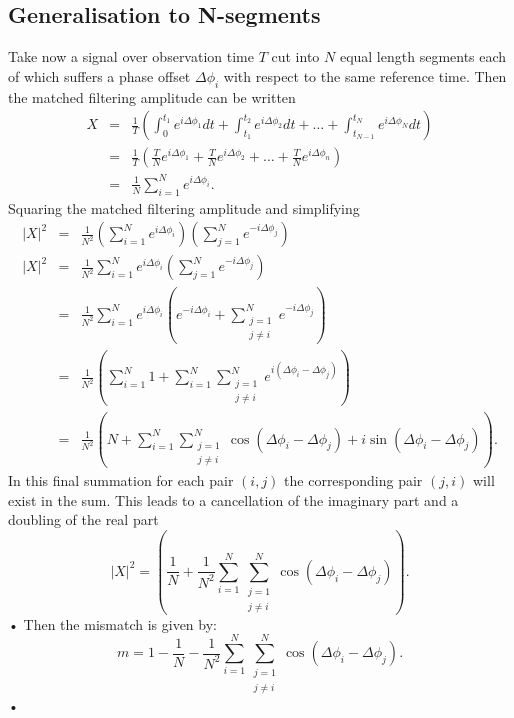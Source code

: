 \subsection{Generalisation to N-segments}
Take now a signal over observation time $T$ cut into $N$ equal length segments
each of which suffers a phase offset $\Delta \phi_{i}$ with respect to the same
reference time. Then the matched filtering amplitude can be written
\begin{eqnarray}
X & = & \frac{1}{T}\left(\int_{0}^{t_{1}}e^{i\Delta\phi_{1}} dt + 
\int_{t_{1}}^{t_{2}}e^{i\Delta\phi_{2}} dt + \dots + 
\int_{t_{N-1}}^{t_{N}}e^{i\Delta\phi_{N}} dt \right) \\
& = &  \frac{1}{T}\left(\frac{T}{N}e^{i\Delta\phi_{1}} + 
\frac{T}{N}e^{i\Delta\phi_{2}} + \dots + \frac{T}{N}e^{i\Delta\phi_{n}} \right)\\
& = & \frac{1}{N} \sum_{i=1}^{N}e^{i\Delta \phi_{i}}.
\end{eqnarray}
Squaring the matched filtering amplitude and simplifying
\begin{eqnarray}
|X|^{2} & = &  \frac{1}{N^{2}} \left(\sum_{i=1}^{N}e^{i\Delta \phi_{i}}\right)\left(\sum_{j=1}^{N}e^{-i\Delta \phi_{j}}\right) \\
|X|^{2} & = &  \frac{1}{N^{2}} \sum_{i=1}^{N}e^{i\Delta \phi_{i}}\left(\sum_{j=1}^{N}e^{-i\Delta \phi_{j}}\right) \\
& = & \frac{1}{N^{2}} \sum_{i=1}^{N}e^{i\Delta \phi_{i}}\left(e^{-i\Delta \phi_{i}} +  \sum_{\substack{j=1 \\j\ne i}}^{N}e^{-i\Delta \phi_{j}}\right) \\
& = & \frac{1}{N^{2}} \left(\sum_{i=1}^{N}1 +   \sum_{i=1}^{N}\sum_{\substack{j=1 \\j\ne i}}^{N}e^{i(\Delta\phi_{i}-\Delta \phi_{j})}\right) \\
& = & \frac{1}{N^{2}} \left(N +   \sum_{i=1}^{N}\sum_{\substack{j=1 \\j\ne i}}^{N}\cos(\Delta\phi_{i} - \Delta\phi_{j}) + i\sin(\Delta\phi_{i} - \Delta\phi_{j})\right).
\end{eqnarray}
In this final summation for each pair $(i,j)$ the corresponding pair $(j, i)$
will exist in the sum. This leads to a cancellation of the imaginary part and a
doubling of the real part
\begin{equation}
|X|^{2}  = \left(\frac{1}{N} + \frac{1}{N^{2}}\sum_{i=1}^{N}\sum_{\substack{j=1 \\j\ne i}}^{N} \cos(\Delta\phi_{i} - \Delta \phi_{j})\right).
\end{equation}•
Then the mismatch is given by:
\begin{equation}
m = 1 - \frac{1}{N} - \frac{1}{N^{2}}\sum_{i=1}^{N}\sum_{\substack{j=1 \\j\ne i}}^{N} \cos(\Delta\phi_{i} - \Delta\phi_{j}).
\label{eqn: phase mismatch}
\end{equation}•
